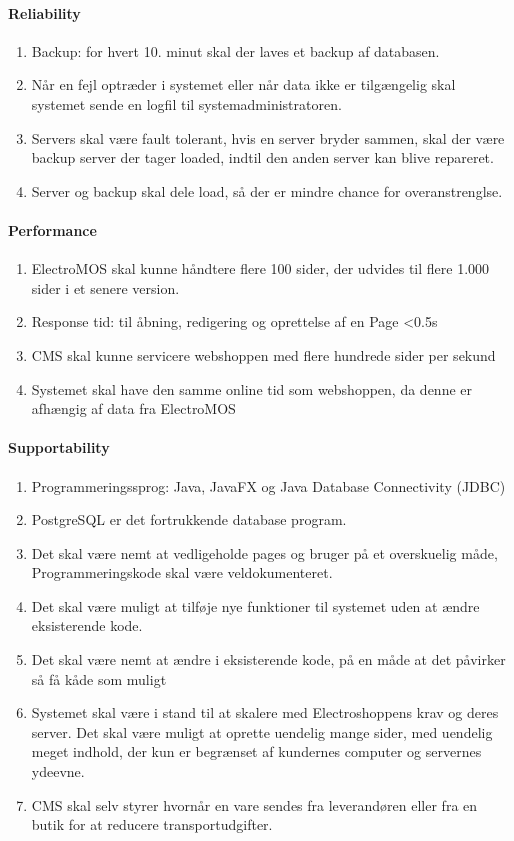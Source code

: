 \paragraph{Reliability}
	\begin{enumerate}
	\item Backup: for hvert 10. minut skal der laves et backup af databasen.
    \item Når en fejl optræder i systemet eller når data ikke er tilgængelig skal systemet sende en logfil til systemadministratoren.
    \item Servers skal være fault tolerant, hvis en server bryder sammen, skal der være backup server der tager loaded, indtil den anden server kan blive repareret.
    \item Server og backup skal dele load, så der er mindre chance for overanstrenglse.
	\end{enumerate}
    
\paragraph{Performance}
	\begin{enumerate}
	\item ElectroMOS skal kunne håndtere flere 100 sider, der udvides til flere 1.000 sider i et senere version.
    \item Response tid: til åbning, redigering og oprettelse af en Page <0.5s
    \item CMS skal kunne servicere webshoppen med flere hundrede sider per sekund
    \item Systemet skal have den samme online tid som webshoppen, da denne er afhængig af data fra ElectroMOS
	\end{enumerate}

\paragraph{Supportability}
	\begin{enumerate}
	\item Programmeringssprog: Java, JavaFX og Java Database Connectivity (JDBC)
    \item PostgreSQL er det fortrukkende database program.
    \item Det skal være nemt at vedligeholde pages og bruger på et overskuelig måde, Programmeringskode skal være veldokumenteret.
    \item Det skal være muligt at tilføje nye funktioner til systemet uden at ændre eksisterende kode.
    \item Det skal være nemt at ændre i eksisterende kode, på en måde at det påvirker så få kåde som muligt
    \item Systemet skal være i stand til at skalere med Electroshoppens krav og deres server. Det skal være muligt at oprette uendelig mange sider, med uendelig meget indhold, der kun er begrænset af kundernes computer og servernes ydeevne.
    \item CMS skal selv styrer hvornår en vare sendes fra leverandøren eller fra en butik for at reducere transportudgifter.
	\end{enumerate}
    
